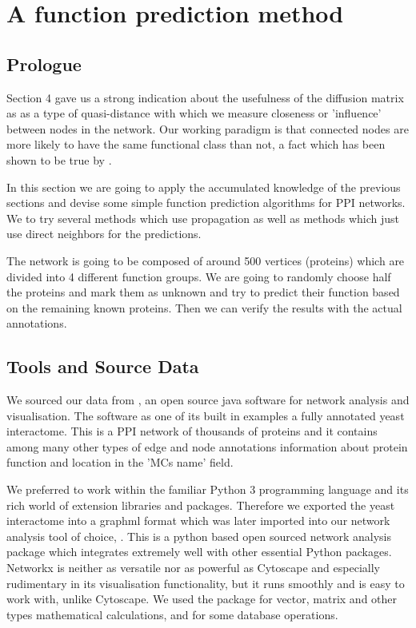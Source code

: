 
\section{A function prediction method}
\subsection*{Prologue}

Section 4 gave us a strong indication about the usefulness of the
diffusion matrix as as a type of quasi-distance with which we
measure closeness or 'influence' between nodes in the network.
Our working paradigm is that connected nodes are more likely to have
the same functional class than not, a fact which has been shown to
be true by \textcite{schwikowski2000network}.

In this section we are going to apply the accumulated knowledge of the
previous sections and devise some simple function prediction algorithms for PPI
networks. We to try several methods which use propagation as well as
methods which just use direct neighbors for the predictions.

The network is going to be composed of around 500 vertices (proteins) which are
divided into 4 different function groups. We are going to randomly choose half
the proteins and mark them as unknown and try to predict their function based
on the remaining known proteins. Then we can verify the results with the
actual annotations.

\subsection{Tools and Source Data}

We sourced our data from \textcite{cytoscape}, an open source
java software for network analysis and visualisation. 
The software as one of its built in examples a
fully annotated yeast interactome. This is a PPI network of
thousands of proteins and it contains among many other types of
edge and node annotations information about protein function and
location in the 'MCs name' field.

We preferred to work within the familiar Python 3 programming
language and its rich world of extension libraries and packages.
Therefore we exported the yeast interactome into a graphml format
which was later imported into our network analysis tool of choice,
\textcite{networkx}. This is a python based open sourced network analysis 
package which integrates extremely well with other essential Python
packages. Networkx is neither as versatile nor as powerful as Cytoscape and
especially rudimentary in its visualisation functionality, but it
runs smoothly and is easy to work with, unlike Cytoscape.
We used the \textcite{numpy} package for vector, matrix and other
types mathematical
calculations, and \textcite{pandas} for some database operations. 

